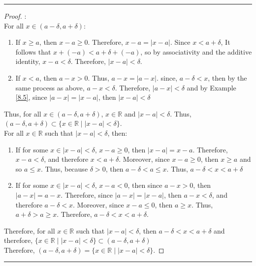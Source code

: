 \documentclass[openany, amssymb, psamsfonts]{amsart}
\newcommand{\bbR}{\mathbb{R}}
\newcommand{\abs}[1]{\lvert #1 \rvert}
\theoremstyle{definition}
\numberwithin{equation}{section}
\begin{document}
\vspace{4pt}     \hrule   \vspace{4pt}
\begin{proof} :\\
For all $x\in (a - \delta, a + \delta)$:
\begin{enumerate}
    \item If $x\geq a$, then $x-a \geq 0$. Therefore, $x-a = \abs{x-a}$. Since $x<a+ \delta$, It follows that $x+(-a)<a+\delta+(-a)$, so by associativity and the additive identity, $x-a<\delta$. Therefore, $\abs{x-a} < \delta$. 
    \item If $x<a$, then $a-x>0$. Thus, $a-x = \abs{a-x}$.  since, $a- \delta<x$, then by the same process as above, $a-x  < \delta$. Therefore, $\abs{a-x} < \delta$ and by Example \ref{8.5}, since $\abs{a-x} = \abs{x-a}$, then $\abs{x-a} < \delta$
\end{enumerate}
Thus, for all $x\in (a - \delta, a + \delta)$, $x\in \bbR$ and $\abs{x-a}<\delta$. Thus, $(a - \delta, a + \delta) \subset \{x \in \mathbb{R} \mid \abs{x - a} < \delta \}$.\\
For all $x\in \bbR$ such that $\abs{x-a}<\delta$, then:
\begin{enumerate}
    \item If for some $x\in \abs{x-a}<\delta$, $x-a \geq 0$, then $\abs{x-a} = x-a$. Therefore, $x-a < \delta$, and therefore $x<a+\delta$. Moreover, since $x-a\geq 0$, then $x\geq a$ and so $a\leq x$. Thus, because $\delta >0$, then $a-\delta < a \leq x$. Thus, $a-\delta <x<a+\delta$
    \item If for some $x\in \abs{x-a}<\delta$, $x-a <0$, then since $a-x >0$, then $\abs{a-x} = a-x$. Therefore, since $\abs{a-x} = \abs{x-a}$, then $a-x < \delta$, and therefore $a-\delta<x$. Moreover, since $x-a\leq 0$, then $a\geq x$. Thus, $a+\delta > a \geq x$. Therefore, $a-\delta < x < a+\delta$.
\end{enumerate}
Therefore, for all $x\in \bbR$ such that $\abs{x-a}<\delta$, then $a-\delta < x < a+\delta$ and therefore, $\{x \in \mathbb{R} \mid \abs{x - a} < \delta \} \subset (a - \delta, a + \delta)$\\
Therefore, $(a - \delta, a + \delta) = \{x \in \mathbb{R} \mid \abs{x - a} < \delta \}.$
\end{proof} \vspace{4pt}     \hrule   \vspace{4pt}
\end{document}
